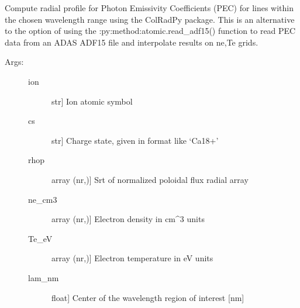 \documentclass[letterpaper,10pt,english]{sphinxmanual}
\begin{document}

\begin{fulllineitems}
\label{\detokenize{aurora:aurora.radiation.get_pec_prof}}
Compute radial profile for Photon Emissivity Coefficients (PEC) for lines within the chosen
wavelength range using the ColRadPy package. This is an alternative to the option of using 
the :py:method:atomic.read\_adf15() function to read PEC data from an ADAS ADF\sphinxhyphen{}15 file and 
interpolate results on ne,Te grids.
\begin{description}
\item[{Args:}] \leavevmode\begin{description}
\item[{ion}] \leavevmode{[}str{]}
Ion atomic symbol

\item[{cs}] \leavevmode{[}str{]}
Charge state, given in format like ‘Ca18+’

\item[{rhop}] \leavevmode{[}array (nr,){]}
Srt of normalized poloidal flux radial array

\item[{ne\_cm3}] \leavevmode{[}array (nr,){]}
Electron density in cm\textasciicircum{}\sphinxhyphen{}3 units

\item[{Te\_eV}] \leavevmode{[}array (nr,){]}
Electron temperature in eV units

\item[{lam\_nm}] \leavevmode{[}float{]}
Center of the wavelength region of interest {[}nm{]}


\end{description}
\end{description}
\end{fulllineitems}
\end{document}
